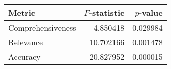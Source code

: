 \documentclass{standalone}
\begin{document}
\begin{tabular}{lrr}
\toprule
Metric & $F$-statistic & $p$-value \\
\midrule
Comprehensiveness & 4.850418 & 0.029984 \\
Relevance & 10.702166 & 0.001478 \\
Accuracy & 20.827952 & 0.000015 \\
\bottomrule
\end{tabular}
\end{document}
